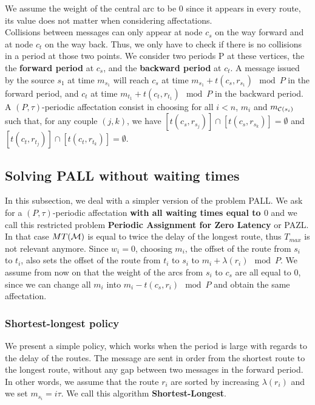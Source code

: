 \documentclass[a4paper,10pt]{article}
\begin{document}
      We assume the weight of the central arc to be $0$ since it appears in every route,
      its value does not matter when considering affectations.\\
      Collisions between messages can only appear at node $c_s$ on the way forward and at node $c_t$ on the way back.
      Thus, we only have to check if there is no collisions in a period at those two points.
      We consider two periods P at these vertices, the the {\bf forward period} at $c_s$, and the {\bf backward period} at $c_t$. A message issued by the source $s_1$ at time $m_{s_1}$ will reach $c_s$ at time $m_{s_1} + t(c_s,r_{s_1}) \mod P$ in the forward period, and  $c_t$ at time $m_{t_1} + t(c_t,r_{t_1})\mod P$ in the backward period.
      A $(P,\tau)$-periodic affectation consist in choosing for all $i < n$, $m_i$ and $m_{{\cal C}(s_i)}$ such that, for any couple $(j,k)$, we have $[t(c_s,r_{s_{j}})] \cap [t(c_s,r_{s_k})] = \emptyset$ and $[t(c_t,r_{t_j})] \cap [t(c_t,r_{t_k})] = \emptyset$.

      

  \subsection{Solving PALL without waiting times}
  
  In this subsection, we deal with a simpler version of the problem PALL.
  We ask for a $(P,\tau)$-periodic affectation {\bf with all waiting times equal to $0$} and we call this restricted problem  
  {\bf Periodic Assignment for Zero Latency} or PAZL. 
  In that case $MT({\cal M})$ is equal to twice the delay of the longest route, thus $T_{max}$ is not relevant anymore. 
  Since $w_i=0$, choosing $m_i$, the offset of the route from $s_i$ to $t_i$, also sets the offset of the route from $t_i$ to $s_i$ to $m_i + \lambda(r_i) \mod P$.
 We assume from now on that the weight of the arcs from $s_i$ to $c_s$ are all equal to $0$, since we can change 
  all $m_i$ into $m_i - t(c_s,r_i) \mod P$ and obtain the same affectation.
  
  
    
  
    \subsubsection{Shortest-longest policy}
    

    
    We present a simple policy, which works when the period is large with regards to the delay of the routes.
    The message are sent in order from the shortest route to the longest route, without any gap between two messages in the forward period.
    In other words, we assume that the route $r_i$ are sorted by increasing $\lambda(r_i)$ and we set $m_{s_i} = i\tau$.
    We call this algorithm {\bf Shortest-Longest}.
      
\end{document}

